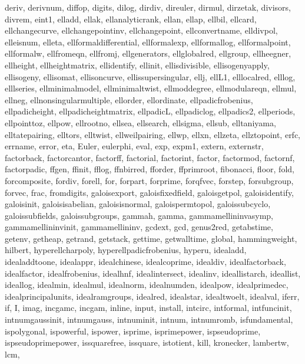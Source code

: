 {{   deriv, derivnum, diffop, digits, dilog, dirdiv, direuler, dirmul,%
   dirzetak, divisors, divrem, eint1, elladd, ellak, ellanalyticrank, ellan,%
   ellap, ellbil, ellcard, ellchangecurve, ellchangepointinv, ellchangepoint,%
   ellconvertname, elldivpol, elleisnum, elleta, ellformaldifferential,%
   ellformalexp, ellformallog, ellformalpoint, ellformalw, ellfromeqn,%
   ellfromj, ellgenerators, ellglobalred, ellgroup, ellheegner, ellheight,%
   ellheightmatrix, ellidentify, ellinit, ellisdivisible, ellisogenyapply,%
   ellisogeny, ellisomat, ellisoncurve, ellissupersingular, ellj, ellL1,%
   elllocalred, elllog, elllseries, ellminimalmodel, ellminimaltwist,%
   ellmoddegree, ellmodulareqn, ellmul, ellneg, ellnonsingularmultiple,%
   ellorder, ellordinate, ellpadicfrobenius, ellpadicheight,%
   ellpadicheightmatrix, ellpadicL, ellpadiclog, ellpadics2, ellperiods,%
   ellpointtoz, ellpow, ellrootno, ellsea, ellsearch, ellsigma, ellsub,%
   elltaniyama, elltatepairing, elltors, elltwist, ellweilpairing, ellwp,%
   ellxn, ellzeta, ellztopoint, erfc, errname, error, eta, Euler, eulerphi,%
   eval, exp, expm1, extern, externstr, factorback, factorcantor, factorff,%
   factorial, factorint, factor, factormod, factornf, factorpadic, ffgen,%
   ffinit, fflog, ffnbirred, fforder, ffprimroot, fibonacci, floor, fold,%
   forcomposite, fordiv, forell, for, forpart, forprime, forqfvec, forstep,%
   forsubgroup, forvec, frac, fromdigits, galoisexport, galoisfixedfield,%
   galoisgetpol, galoisidentify, galoisinit, galoisisabelian, galoisisnormal,%
   galoispermtopol, galoissubcyclo, galoissubfields, galoissubgroups,%
   gammah, gamma, gammamellininvasymp, gammamellininvinit, gammamellininv,%
   gcdext, gcd, genus2red, getabstime, getenv, getheap, getrand, getstack,%
   gettime, getwalltime, global, hammingweight, hilbert, hyperellcharpoly,%
   hyperellpadicfrobenius, hyperu, idealadd, idealaddtoone, idealappr,%
   idealchinese, idealcoprime, idealdiv, idealfactorback, idealfactor,%
   idealfrobenius, idealhnf, idealintersect, idealinv, ideallistarch,%
   ideallist, ideallog, idealmin, idealmul, idealnorm, idealnumden, idealpow,%
   idealprimedec, idealprincipalunits, idealramgroups, idealred, idealstar,%
   idealtwoelt, idealval, iferr, if, I, imag, incgamc, incgam, inline, input,%
   install, intcirc, intformal, intfuncinit, intnumgaussinit, intnumgauss,%
   intnuminit, intnum, intnumromb, isfundamental, ispolygonal, ispowerful,%
   ispower, isprime, isprimepower, ispseudoprime, ispseudoprimepower,%
   issquarefree, issquare, istotient, kill, kronecker, lambertw, lcm,%
}}
